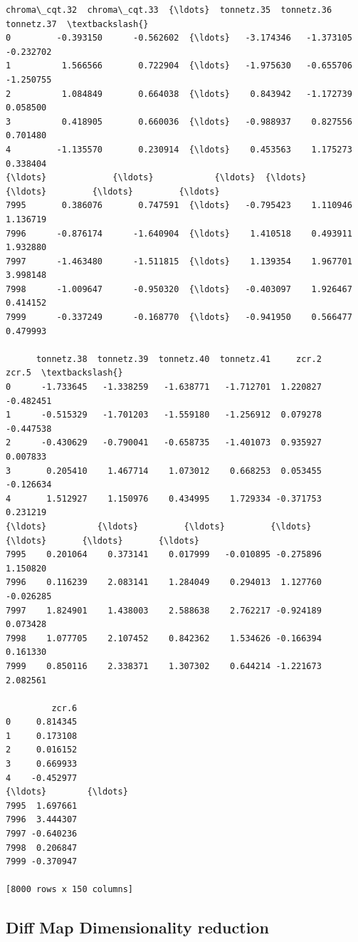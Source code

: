 \documentclass[11pt]{article}
\begin{document}
\begin{tcolorbox}[breakable, size=fbox, boxrule=.5pt, pad at break*=1mm, opacityfill=0]
\begin{Verbatim}[commandchars=\\\{\}]
      chroma\_cqt.32  chroma\_cqt.33  {\ldots}  tonnetz.35  tonnetz.36  tonnetz.37  \textbackslash{}
0         -0.393150      -0.562602  {\ldots}   -3.174346   -1.373105   -0.232702
1          1.566566       0.722904  {\ldots}   -1.975630   -0.655706   -1.250755
2          1.084849       0.664038  {\ldots}    0.843942   -1.172739    0.058500
3          0.418905       0.660036  {\ldots}   -0.988937    0.827556    0.701480
4         -1.135570       0.230914  {\ldots}    0.453563    1.175273    0.338404
{\ldots}             {\ldots}            {\ldots}  {\ldots}         {\ldots}         {\ldots}         {\ldots}
7995       0.386076       0.747591  {\ldots}   -0.795423    1.110946    1.136719
7996      -0.876174      -1.640904  {\ldots}    1.410518    0.493911    1.932880
7997      -1.463480      -1.511815  {\ldots}    1.139354    1.967701    3.998148
7998      -1.009647      -0.950320  {\ldots}   -0.403097    1.926467    0.414152
7999      -0.337249      -0.168770  {\ldots}   -0.941950    0.566477    0.479993

      tonnetz.38  tonnetz.39  tonnetz.40  tonnetz.41     zcr.2     zcr.5  \textbackslash{}
0      -1.733645   -1.338259   -1.638771   -1.712701  1.220827 -0.482451
1      -0.515329   -1.701203   -1.559180   -1.256912  0.079278 -0.447538
2      -0.430629   -0.790041   -0.658735   -1.401073  0.935927  0.007833
3       0.205410    1.467714    1.073012    0.668253  0.053455 -0.126634
4       1.512927    1.150976    0.434995    1.729334 -0.371753  0.231219
{\ldots}          {\ldots}         {\ldots}         {\ldots}         {\ldots}       {\ldots}       {\ldots}
7995    0.201064    0.373141    0.017999   -0.010895 -0.275896  1.150820
7996    0.116239    2.083141    1.284049    0.294013  1.127760 -0.026285
7997    1.824901    1.438003    2.588638    2.762217 -0.924189  0.073428
7998    1.077705    2.107452    0.842362    1.534626 -0.166394  0.161330
7999    0.850116    2.338371    1.307302    0.644214 -1.221673  2.082561

         zcr.6
0     0.814345
1     0.173108
2     0.016152
3     0.669933
4    -0.452977
{\ldots}        {\ldots}
7995  1.697661
7996  3.444307
7997 -0.640236
7998  0.206847
7999 -0.370947

[8000 rows x 150 columns]
\end{Verbatim}
\end{tcolorbox}
        
    \hypertarget{diff-map-dimensionality-reduction}{%
\subsection{Diff Map Dimensionality
reduction}\label{diff-map-dimensionality-reduction}}
\end{document}
